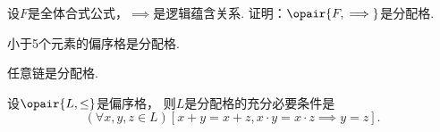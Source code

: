 \begin{example}
设\(F\)是全体合式公式，\(\implies\)是逻辑蕴含关系.
证明：\(\opair{F,\implies}\)是分配格.
\end{example}

\begin{theorem}
小于5个元素的偏序格是分配格.
\end{theorem}

\begin{theorem}
任意链是分配格.
\end{theorem}

\begin{theorem}
设\(\opair{L,\leq}\)是偏序格，
则\(L\)是分配格的充分必要条件是\begin{equation*}
	(\forall x,y,z \in L)
	[
		x + y = x + z,
		x \cdot y = x \cdot z
		\implies
		y = z
	].
\end{equation*}
\end{theorem}
